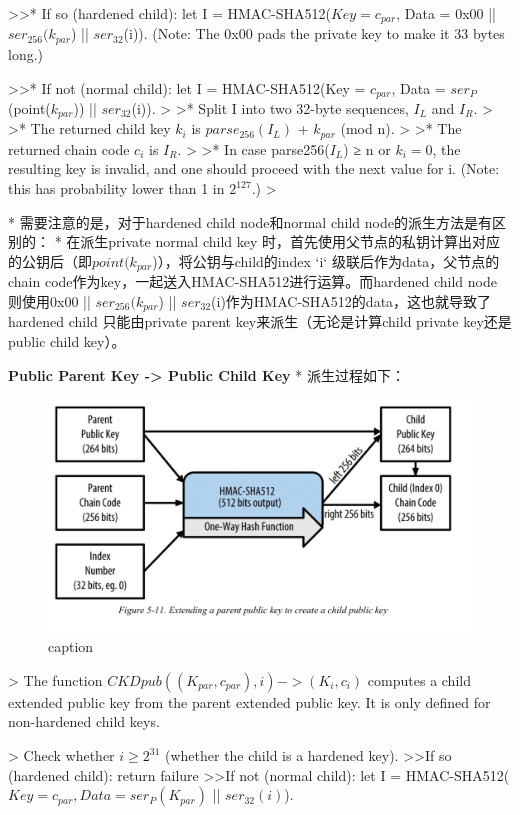 \documentclass{article}
\begin{document}
>>* If so (hardened child): let I = HMAC-SHA512($Key = c_{par}$, Data = 0x00 || $ser_{256}(k_{par}$) || $ser_{32}$(i)). (Note: The 0x00 pads the private key to make it 33 bytes long.)  

>>* If not (normal child): let I = HMAC-SHA512(Key = $c_{par}$, Data = $ser_P$(point($k_{par}$)) || $ser_{32}$(i)).  
>
>* Split I into two 32-byte sequences, $I_L$ and $I_R$.  
>
>* The returned child key $k_i$ is $parse_{256}(I_L)$ + $k_{par}$ (mod n).
>
>* The returned chain code $c_i$ is $I_R$.  
>
>* In case parse256($I_L$) ≥ n or $k_i = 0$, the resulting key is invalid, and one should proceed with the next value for i. (Note: this has probability lower than 1 in $2^{127}$.)  
>

* 需要注意的是，对于hardened child node和normal child node的派生方法是有区别的：
* 在派生private normal child key 时，首先使用父节点的私钥计算出对应的公钥后（即$point(k_{par}$)），将公钥与child的index `i` 级联后作为data，父节点的chain code作为key，一起送入HMAC-SHA512进行运算。而hardened child node 则使用0x00 || $ser_{256}(k_{par}$) || $ser_{32}$(i)作为HMAC-SHA512的data，这也就导致了hardened child 只能由private parent key来派生（无论是计算child private key还是public child key）。


\textbf{Public Parent Key -> Public Child Key}
* 派生过程如下：

\begin{figure}[h]
\centering
\includegraphics[width=\textwidth]{./CKDpub.png}
\caption{caption}\label{fig-parsesig}
\end{figure}

> The function $CKDpub((K_{par}, c_{par}), i) -> (K_i, c_i)$ computes a child extended public key from the parent extended public key. It is only defined for non-hardened child keys.

> Check whether $i ≥ 2^{31}$ (whether the child is a hardened key).
>>If so (hardened child): return failure  
>>If not (normal child): let I = HMAC-SHA512($Key = c_{par}, Data = ser_P(K_{par})$ || $ser_{32}(i)$).
\end{document}
